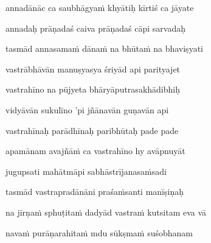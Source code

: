 annadānāc ca saubhāgya\.m khyātiḥ kīrtiś ca jāyate \veg\dontdisplaylinenum

annadaḥ prāṇadaś caiva prāṇadaś cāpi sarvadaḥ\thinspace{\dandab} \dontdisplaylinenum

tasmād annasama\.m dāna\.m na bhūta\.m na bhaviṣyati \veg\dontdisplaylinenum



vastrābhāvān manuṣyasya śriyād api parityajet\thinspace{\dandab} \dontdisplaylinenum

vastrahīno na pūjyeta bhāryāputrasakhādibhiḥ \veg\dontdisplaylinenum

vidyāvān sukulīno 'pi jñānavān guṇavān api\thinspace{\dandab} \dontdisplaylinenum

vastrahīnaḥ parādhīnaḥ paribhūtaḥ pade pade \veg\dontdisplaylinenum

apamānam avajñā\.m ca vastrahīno hy avāpnuyāt\thinspace{\dandab} \dontdisplaylinenum

jugupsati mahātmāpi sabhāstrījanasa\.msadi \veg\dontdisplaylinenum

tasmād vastrapradānāni praśa\.msanti manīṣiṇaḥ\thinspace{\dandab} \dontdisplaylinenum

na jīrṇa\.m sphuṭita\.m dadyād vastra\.m kutsitam eva vā \veg\dontdisplaylinenum

nava\.m purāṇarahita\.m mdu sūkṣma\.m suśobhanam\thinspace{\dandab} \dontdisplaylinenum

